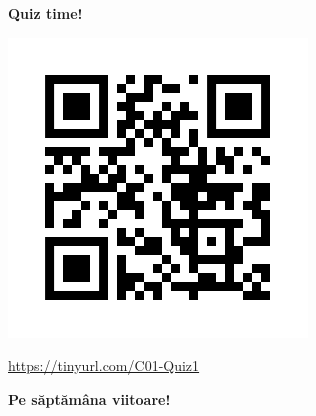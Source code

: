 \documentclass[xcolor=pdftex,romanian,colorlinks]{beamer}
\begin{document}
\begin{frame}
  \vfill
  \centering

\textbf{\large \alert{Quiz time!}}

\includegraphics[scale=.35]{../Quiz/C01-Q1.png}

 \url{https://tinyurl.com/C01-Quiz1}
  \vfill
\end{frame}
\begin{frame}
  \vfill
  \centering

\textbf{Pe săptămâna viitoare!}

  \vfill
\end{frame}
\end{document}
